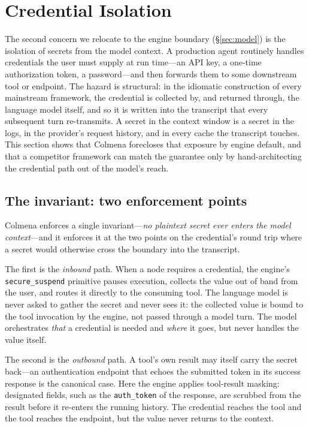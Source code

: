 \section{Credential Isolation}
\label{sec:credentials}

The second concern we relocate to the engine boundary
(\S\ref{sec:model}) is the isolation of secrets from the model context. A
production agent routinely handles credentials the user must supply at run
time---an API key, a one-time authorization token, a password---and then
forwards them to some downstream tool or endpoint. The hazard is
structural: in the idiomatic construction of every mainstream framework,
the credential is collected by, and returned through, the language model
itself, and so it is written into the transcript that every subsequent turn
re-transmits. A secret in the context window is a secret in the logs, in
the provider's request history, and in every cache the transcript touches.
This section shows that Colmena forecloses that exposure by engine default,
and that a competitor framework can match the guarantee only by
hand-architecting the credential path out of the model's reach.

\subsection{The invariant: two enforcement points}
\label{subsec:cred-invariant}

Colmena enforces a single invariant---\emph{no plaintext secret ever
enters the model context}---and it enforces it at the two points on the
credential's round trip where a secret would otherwise cross the boundary
into the transcript.

The first is the \emph{inbound} path. When a node requires a credential,
the engine's \texttt{secure\_suspend} primitive pauses execution, collects
the value out of band from the user, and routes it directly to the
consuming tool. The language model is never asked to gather the secret and
never sees it: the collected value is bound to the tool invocation by the
engine, not passed through a model turn. The model orchestrates
\emph{that} a credential is needed and \emph{where} it goes, but never
handles the value itself.

The second is the \emph{outbound} path. A tool's own result may itself
carry the secret back---an authentication endpoint that echoes the
submitted token in its success response is the canonical case. Here the
engine applies tool-result masking: designated fields, such as the
\texttt{auth\_token} of the response, are scrubbed from the result before
it re-enters the running history. The credential reaches the tool and the
tool reaches the endpoint, but the value never returns to the context.

